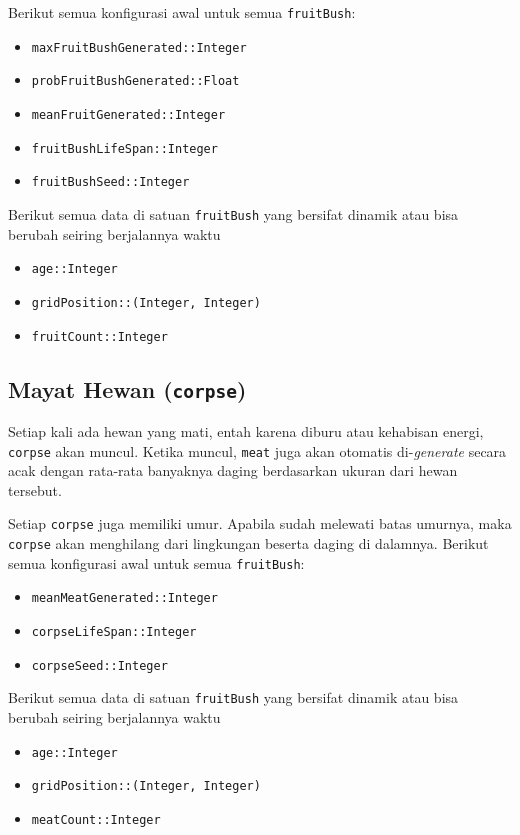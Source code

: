 \documentclass[12pt]{article}
\begin{document}
\noindent Berikut semua konfigurasi awal untuk semua \texttt{fruitBush}:
\begin{itemize}
    \item \texttt{maxFruitBushGenerated::Integer}
    \item \texttt{probFruitBushGenerated::Float }
    \item \texttt{meanFruitGenerated::Integer}
    \item \texttt{fruitBushLifeSpan::Integer}
    \item \texttt{fruitBushSeed::Integer}
\end{itemize}
\noindent Berikut semua data di satuan \texttt{fruitBush} yang bersifat dinamik atau bisa berubah seiring berjalannya waktu
\begin{itemize}
    \item \texttt{age::Integer}
    \item \texttt{gridPosition::(Integer, Integer)}
    \item \texttt{fruitCount::Integer}
\end{itemize}
\subsection{Mayat Hewan (\texttt{corpse})}
Setiap kali ada hewan yang mati, entah karena diburu atau kehabisan energi, \texttt{corpse} akan muncul. Ketika muncul, \texttt{meat} juga akan otomatis di-\textit{generate} secara acak dengan rata-rata banyaknya daging berdasarkan ukuran dari hewan tersebut.

\noindent Setiap \texttt{corpse} juga memiliki umur. Apabila sudah melewati batas umurnya, maka \texttt{corpse} akan menghilang dari lingkungan beserta daging di dalamnya.
\noindent Berikut semua konfigurasi awal untuk semua \texttt{fruitBush}:
\begin{itemize}
    \item \texttt{meanMeatGenerated::Integer}
    \item \texttt{corpseLifeSpan::Integer}
    \item \texttt{corpseSeed::Integer}
\end{itemize}
\noindent Berikut semua data di satuan \texttt{fruitBush} yang bersifat dinamik atau bisa berubah seiring berjalannya waktu
\begin{itemize}
    \item \texttt{age::Integer}
    \item \texttt{gridPosition::(Integer, Integer)}
    \item \texttt{meatCount::Integer}
\end{itemize}
\end{document}

